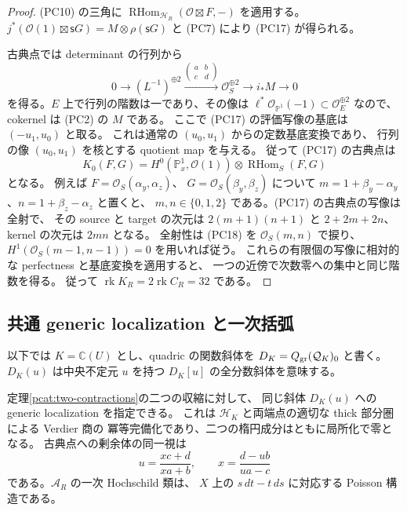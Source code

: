 \begin{proof}
(PC10) の三角に
$\operatorname{RHom}_{\mathcal H_R}(\mathcal O\boxtimes F,-)$ を適用する。
$j^*(\mathcal O(1)\boxtimes\mathsf sG)=M\otimes\rho(\mathsf sG)$ と
(PC7) により (PC17) が得られる。

古典点では determinant の行列から
\[
 0\longrightarrow (L^{-1})^{\oplus2}
 \xrightarrow{\left(\begin{smallmatrix}a&b\\c&d\end{smallmatrix}\right)}
 \mathcal O_S^{\oplus2}\longrightarrow i_*M\longrightarrow0
 \tag{PC18}
\]
を得る。$E$ 上で行列の階数は一であり、その像は
$\ell^*\mathcal O_{\mathbb P^1}(-1)\subset\mathcal O_E^{\oplus2}$ なので、
cokernel は (PC2) の $M$ である。
ここで (PC17) の評価写像の基底は $(-u_1,u_0)$ と取る。
これは通常の $(u_0,u_1)$ からの定数基底変換であり、
行列の像 $(u_0,u_1)$ を核とする quotient map を与える。
従って (PC17) の古典点は
\[
 K_0(F,G)=H^0(\mathbb P^1_x,\mathcal O(1))\otimes
                    \operatorname{RHom}_S(F,G)
 \tag{PC19}
\]
となる。
例えば $F=\mathcal O_S(\alpha_y,\alpha_z)$、
$G=\mathcal O_S(\beta_y,\beta_z)$ について
$m=1+\beta_y-\alpha_y$、$n=1+\beta_z-\alpha_z$ と置くと、
$m,n\in\{0,1,2\}$ である。(PC17) の古典点の写像は全射で、
その source と target の次元は $2(m+1)(n+1)$ と $2+2m+2n$、
kernel の次元は $2mn$ となる。
全射性は (PC18) を $\mathcal O_S(m,n)$ で捩り、
$H^1(\mathcal O_S(m-1,n-1))=0$ を用いれば従う。
これらの有限個の写像に相対的な perfectness と基底変換を適用すると、
一つの近傍で次数零への集中と同じ階数を得る。
従って $\operatorname{rk}K_R=2\operatorname{rk}C_R=32$ である。
\end{proof}

\subsection{共通 generic localization と一次括弧}

以下では $K=\mathbb C(U)$ とし、quadric の関数斜体を
$D_K=Q_{\rm gr}(\mathcal Q_K)_0$ と書く。
$D_K(u)$ は中央不定元 $u$ を持つ $D_K[u]$ の全分数斜体を意味する。

\begin{theorem}\label{pcat:generic}
定理\ref{pcat:two-contractions}の二つの収縮に対して、
同じ斜体 $D_K(u)$ への generic localization を指定できる。
これは $\mathcal H_K$ と両端点の適切な thick 部分圏による Verdier 商の
冪等完備化であり、二つの楕円成分はともに局所化で零となる。
古典点への剰余体の同一視は
\[
 u=\frac{xc+d}{xa+b},\qquad
 x=\frac{d-ub}{ua-c}
 \tag{PC20}
\]
である。$\mathcal A_R$ の一次 Hochschild 類は、
$X$ 上の $s\,dt-t\,ds$ に対応する Poisson 構造である。
\end{theorem}

